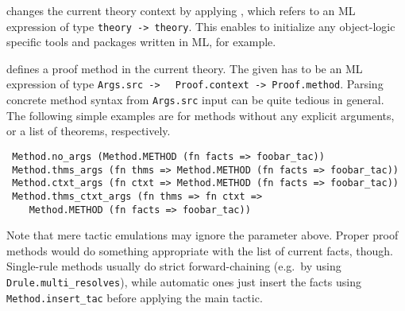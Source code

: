 \begin{isabellebody}
\begin{isamarkuptext}
\begin{descr}
  \item [\isa{\isacommand{setup}}~\isa{text}] changes the current theory
  context by applying , which refers to an ML expression
  of type \verb|theory -> theory|.  This enables to initialize
  any object-logic specific tools and packages written in ML, for
  example.
  
  \item [\isa{\isacommand{method{\isacharunderscore}setup}}~\isa{name\ {\isacharequal}\ text\ description}]
  defines a proof method in the current theory.  The given  has to be an ML expression of type \verb|Args.src ->|\isasep\isanewline%
\verb|  Proof.context -> Proof.method|.  Parsing concrete method syntax
  from \verb|Args.src| input can be quite tedious in general.  The
  following simple examples are for methods without any explicit
  arguments, or a list of theorems, respectively.

{\footnotesize
\begin{verbatim}
 Method.no_args (Method.METHOD (fn facts => foobar_tac))
 Method.thms_args (fn thms => Method.METHOD (fn facts => foobar_tac))
 Method.ctxt_args (fn ctxt => Method.METHOD (fn facts => foobar_tac))
 Method.thms_ctxt_args (fn thms => fn ctxt =>
    Method.METHOD (fn facts => foobar_tac))
\end{verbatim}
}

  Note that mere tactic emulations may ignore the 
  parameter above.  Proper proof methods would do something
  appropriate with the list of current facts, though.  Single-rule
  methods usually do strict forward-chaining (e.g.\ by using \verb|Drule.multi_resolves|), while automatic ones just insert the facts
  using \verb|Method.insert_tac| before applying the main tactic.


\end{descr}
\end{isamarkuptext}
\end{isabellebody}
